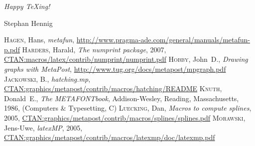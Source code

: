 \documentclass{article}
\begin{document}
\nobreak
\bigskip
\raggedright
\parbox{\linewidth}{\itshape
  Happy \TeX ing!\par
  Stephan Hennig
}


\begin{thebibliography}{999}
 \textsc{Hagen}, Hans, \emph{metafun}, \url{http://www.pragma-ade.com/general/manuals/metafun-p.pdf}
 \textsc{Harders}, Harald, \emph{The numprint package}, 2007, \url{CTAN:macros/latex/contrib/numprint/numprint.pdf}
 \textsc{Hobby}, John~D., \emph{Drawing graphs with MetaPost}, \url{http://www.tug.org/docs/metapost/mpgraph.pdf}
 \textsc{Jackowski}, B., \emph{hatching.mp}, \url{CTAN:graphics/metapost/contrib/macros/hatching/README}
 \textsc{Knuth}, Donald~E., \emph{The METAFONTbook}, Addison-Wesley, Reading, Massachusetts, 1986, (Computers \& Typesetting, C)
 \textsc{Luecking}, Dan, \emph{Macros to compute splines}, 2005, \url{CTAN:graphics/metapost/contrib/macros/splines/splines.pdf}
 \textsc{Morawski}, Jens-Uwe, \emph{latexMP}, 2005, \url{CTAN:graphics/metapost/contrib/macros/latexmp/doc/latexmp.pdf}
\end{thebibliography}
\end{document}
